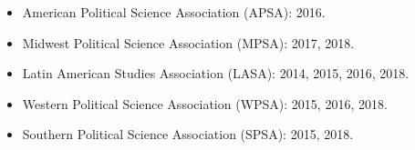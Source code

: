 \begin{itemize}
\item American Political Science Association (APSA): 2016.
\item Midwest Political Science Association (MPSA): 2017, 2018.
\item Latin American Studies Association (LASA): 2014, 2015, 2016, 2018.
\item Western Political Science Association (WPSA): 2015, 2016, 2018.
\item Southern Political Science Association (SPSA): 2015, 2018.
\end{itemize}
